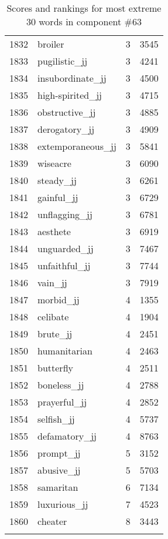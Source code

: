 \begin{longtable}[!htbp]{| rlr@{.}l |}
    1832 & broiler & 3 & 3545 \\
    1833 & pugilistic\_jj & 3 & 4241 \\
    1834 & insubordinate\_jj & 3 & 4500 \\
    1835 & high-spirited\_jj & 3 & 4715 \\
    1836 & obstructive\_jj & 3 & 4885 \\
    1837 & derogatory\_jj & 3 & 4909 \\
    1838 & extemporaneous\_jj & 3 & 5841 \\
    1839 & wiseacre & 3 & 6090 \\
    1840 & steady\_jj & 3 & 6261 \\
    1841 & gainful\_jj & 3 & 6729 \\
    1842 & unflagging\_jj & 3 & 6781 \\
    1843 & aesthete & 3 & 6919 \\
    1844 & unguarded\_jj & 3 & 7467 \\
    1845 & unfaithful\_jj & 3 & 7744 \\
    1846 & vain\_jj & 3 & 7919 \\
    1847 & morbid\_jj & 4 & 1355 \\
    1848 & celibate & 4 & 1904 \\
    1849 & brute\_jj & 4 & 2451 \\
    1850 & humanitarian & 4 & 2463 \\
    1851 & butterfly & 4 & 2511 \\
    1852 & boneless\_jj & 4 & 2788 \\
    1853 & prayerful\_jj & 4 & 2852 \\
    1854 & selfish\_jj & 4 & 5737 \\
    1855 & defamatory\_jj & 4 & 8763 \\
    1856 & prompt\_jj & 5 & 3152 \\
    1857 & abusive\_jj & 5 & 5703 \\
    1858 & samaritan & 6 & 7134 \\
    1859 & luxurious\_jj & 7 & 4523 \\
    1860 & cheater & 8 & 3443 \\
    \hline
    \caption{Scores and rankings for most extreme 30 words in component \#63} \\
\end{longtable}
